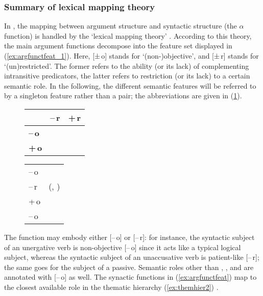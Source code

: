 \subsubsection{Summary of lexical mapping theory}

In \Lfg{}, the mapping between argument structure and syntactic structure (the
$\alpha$ function) is handled by the `lexical mapping theory'
\citep[324--348]{bresnan2016}. According to this theory, the main argument
functions decompose into the feature set displayed in
(\ref{ex:argfunctfeat_1}). Here, [±\,o] stands for `(non-)objective', and
[±\,r] stands for `(un)restricted'. The former refers to the ability (or its
lack) of complementing intransitive predicators, the latter refers to
restriction (or its lack) to a certain semantic role. In the following, the
different semantic features will be referred to by a singleton feature rather
than a pair; the abbreviations are given in (\ref{ex:argfunctfeat_2}).

\begin{figure}[h]
\pex\label{ex:argfunctfeat}
\a\label{ex:argfunctfeat_1}%
	\begin{tabu}[t]{>{\bfseries}l c c}
	& \textbf{–\,r}
	& \textbf{+\,r}
	\\

	\midrule

	–\,o
	& \Subj
	& \Oblique
	\\

	+\,o
	& \Obj
	& \SObj
	\\

	\bottomrule
	\end{tabu}

\a\label{ex:argfunctfeat_2}%
	\begin{tabular}[t]{@{} l @{\quad$\mapsto$\quad} l}
	–\,o	&	\Subj\\
	–\,r	&	\Obj(, \Subj)\\
	+\,o	&	\SObj\\
	–\,o	&	\Oblique\\
	\end{tabular}
\xe
\end{figure}

The \Subj{} function may embody either [–\,o] or [–\,r]: for instance, the
syntactic subject of an unergative verb is non-objective [–\,o] since it acts
like a typical logical subject, whereas the syntactic subject of an
unaccusative verb is patient-like \mbox{[–\,r]}; the same goes for the subject
of a passive. Semantic roles other than \Subj{}, \Obj{}, and \SObj{} are
annotated with [–\,o] as well. The synactic functions in
(\ref{ex:argfunctfeat}) map to the closest available role in the thematic
hierarchy (\ref{ex:themhier2}) \citep[329]{bresnan2016}.

